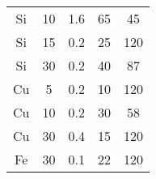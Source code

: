 \begin{table}[ht]
\begin{tabular}{ccccc}
        Si     & 10                          & 1.6                          & 65             & 45            \\
        Si     & 15                          & 0.2                          & 25             & 120           \\
        Si     & 30                          & 0.2                          & 40             & 87            \\
        Cu     & 5                           & 0.2                          & 10             & 120           \\
        Cu     & 10                          & 0.2                          & 30             & 58            \\
        Cu     & 30                          & 0.4                          & 15             & 120           \\
        Fe     & 30                          & 0.1                          & 22             & 120
    \end{tabular}
\end{table}
